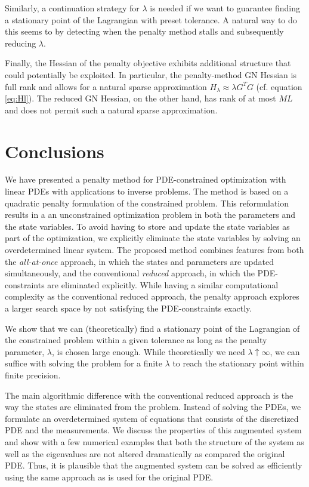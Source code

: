 \documentclass{iopart}
\begin{document}
Similarly, a continuation strategy for $\lambda$ is needed if we want to guarantee finding a stationary point of the Lagrangian with preset tolerance. A natural way to do this seems to by detecting when the penalty method stalls and subsequently reducing $\lambda$.

Finally, the Hessian of the penalty objective exhibits additional structure that could potentially be exploited. In particular, the penalty-method GN Hessian is full rank and allows for a natural sparse approximation $H_{\lambda} \approx \lambda G^TG$ (cf. equation \ref{eq:Hl}). The reduced GN Hessian, on the other hand, has rank of at most $ML$ and does not permit such a natural sparse approximation.

\section{Conclusions}
\label{conclusion}
We have presented a penalty method for PDE-constrained optimization with linear PDEs with applications to inverse problems. The method is based on a quadratic penalty formulation of the constrained problem. This reformulation results in a an unconstrained optimization problem in both the parameters and the state variables. To avoid having to store and update the state variables as part of the optimization, we explicitly eliminate
the state variables by solving an overdetermined linear system. The proposed method combines features from both the \emph{all-at-once} approach, in which the states and parameters are updated simultaneously, and the conventional \emph{reduced} approach, in which the PDE-constraints are eliminated explicitly. While having a similar computational complexity as the conventional reduced approach, the penalty approach explores a larger search space by not satisfying the PDE-constraints exactly. 

We show that we can (theoretically) find a stationary point of the Lagrangian of the constrained problem within a given tolerance as long as the penalty parameter, $\lambda$,
is chosen large enough. While theoretically we need $\lambda \uparrow \infty$, we can suffice with solving the problem for a finite $\lambda$ to reach the stationary point within finite precision. 

The main algorithmic difference with the conventional reduced approach is the way the states are eliminated from the problem. Instead of solving the PDEs, we formulate an overdetermined system of equations that consists of the discretized PDE and the measurements. We discuss the properties of this augmented system and show with a few numerical examples that both the structure of the system as well as the eigenvalues are not altered dramatically as compared the original PDE. Thus, it is plausible that the augmented system can be solved as efficiently using the same approach as is used for the original PDE.
\end{document}
